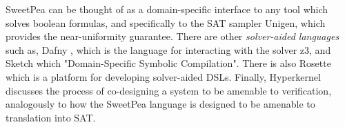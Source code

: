 SweetPea can be thought of as a domain-specific interface to any tool which solves boolean formulas, and specifically to the SAT sampler Unigen, which provides the near-uniformity guarantee. There are other \emph{solver-aided languages} such as, Dafny \cite{leino2013developing}, which is the language for interacting with the solver z3, and Sketch \cite{bodik2017domain} which "Domain-Specific Symbolic Compilation". There is also Rosette \cite{torlak2014lightweight} which is a platform for developing solver-aided DSLs. Finally, Hyperkernel \cite{nelson2017hyperkernel} discusses the process of co-designing a system to be amenable to verification, analogously to how the SweetPea language is designed to be amenable to translation into SAT.
